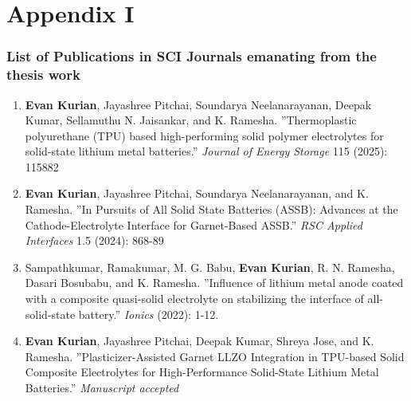 \chapter*{Appendix I}

\subsection*{List of Publications in SCI Journals emanating from the thesis work}
\vspace{1cm}
\begin{enumerate}
\item \textbf{Evan Kurian}, Jayashree Pitchai, Soundarya Neelanarayanan, Deepak Kumar, Sellamuthu N. Jaisankar, and K. Ramesha. ”Thermoplastic polyurethane (TPU) based high-performing solid polymer electrolytes for solid-state lithium metal batteries.” \textit{Journal of Energy Storage} 115 (2025): 115882

\item \textbf{Evan Kurian}, Jayashree Pitchai, Soundarya Neelanarayanan, and K. Ramesha. ”In Pursuits of All Solid State Batteries (ASSB): Advances at the Cathode-Electrolyte Interface for Garnet-Based ASSB.” \textit{RSC Applied Interfaces} 1.5 (2024): 868-89

\item Sampathkumar, Ramakumar, M. G. Babu, \textbf{Evan Kurian}, R. N. Ramesha, Dasari Bosubabu, and K. Ramesha. ”Influence of lithium metal anode coated with a composite quasi-solid electrolyte on stabilizing the interface of all-solid-state battery.” \textit{Ionics} (2022): 1-12.

\item \textbf{Evan Kurian}, Jayashree Pitchai, Deepak Kumar, Shreya Jose, and K. Ramesha. ”Plasticizer-Assisted Garnet LLZO Integration in TPU-based Solid Composite Electrolytes for High-Performance Solid-State Lithium Metal Batteries.” \textit{Manuscript accepted}
\end{enumerate}

